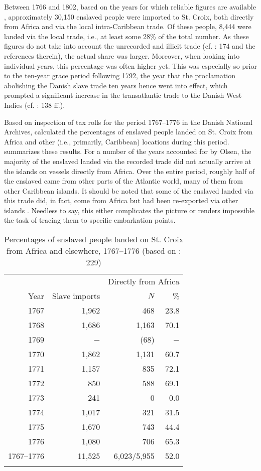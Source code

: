 \documentclass[output=paper,colorlinks,citecolor=brown]{langscibook}
\begin{document}
Between 1766 and 1802, based on the years for which reliable figures are available \citep[cf.][208--209]{GreenPedersen_1975}, approximately 30,150 enslaved people were imported to St. Croix, both directly from Africa and via the local intra-Caribbean trade. Of these people, 8,444 were landed via the local trade, i.e., at least some 28\% of the total number. As these figures do not take into account the unrecorded and illicit trade (cf. \cite{Gobel_2016}: 174 and the references therein), the actual share was larger. Moreover, when looking into individual years, this percentage was often higher yet. This was especially so prior to the ten-year grace period following 1792, the year that the proclamation abolishing the Danish slave trade ten years hence went into effect, which prompted a significant increase in the transatlantic trade to the Danish West Indies (cf. \cite{Gobel_2016}: 138 ff.).

Based on inspection of tax rolls for the period 1767–1776 in the Danish National Archives, \citet[229]{Olsen_1988} calculated the percentages of enslaved people landed on St. Croix from Africa and other (i.e., primarily, Caribbean) locations during this period.  summarizes these results. For a number of the years accounted for by Olsen, the majority of the enslaved landed via the recorded trade did not actually arrive at the islands on vessels directly from Africa. Over the entire period, roughly half of the enslaved came from other parts of the Atlantic world, many of them from other Caribbean islands. It should be noted that some of the enslaved landed via this trade did, in fact, come from Africa but had been re-exported via other islands \citep[cf.][233--235]{Olsen_1988}. Needless to say, this either complicates the picture or renders impossible the task of tracing them to specific embarkation points.

\begin{table}
\begin{tabular}{rrrr}
    \lsptoprule
    {} & {} & \multicolumn{2}{c}{Directly from Africa} \\ \cmidrule(lr){3-4}
    Year & Slave imports & $N$ & \%\\\midrule
    1767 & 1,962 & 468 & 23.8 \\
    1768 & 1,686 & 1,163 & 70.1 \\
    1769 & − & (68) & − \\
    1770 & 1,862 & 1,131 & 60.7 \\
    1771 & 1,157 & 835 & 72.1 \\
    1772 & 850 & 588 & 69.1 \\
    1773 & 241 & 0 & 0.0 \\
    1774 & 1,017 & 321 & 31.5 \\
    1775 & 1,670 & 743 & 44.4 \\
    1776 & 1,080 & 706 & 65.3 \\\midrule
    1767–1776 & 11,525 & 6,023/5,955 & 52.0 \\ \lspbottomrule
\end{tabular}
\caption{Percentages of enslaved people landed on St. Croix from Africa and elsewhere, 1767–1776 (based on \cite{Olsen_1988}: 229)}
\label{tab:tab2_02}
\end{table}
\end{document}
